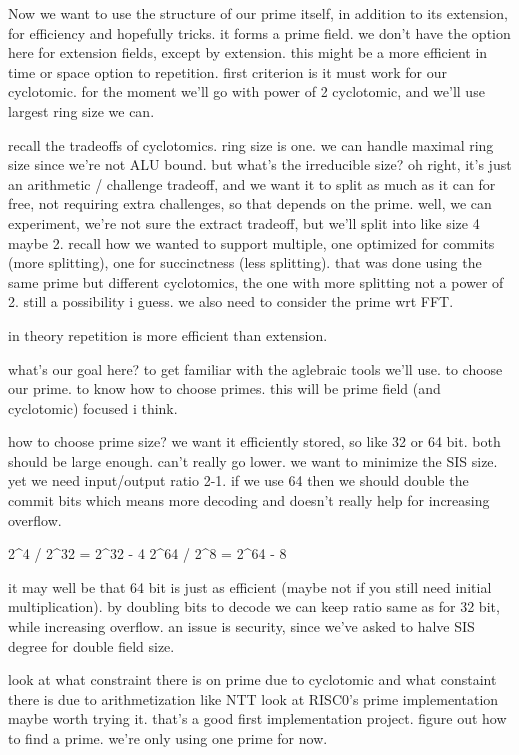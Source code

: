 Now we want to use the structure of our prime itself, in addition to its extension, for efficiency and hopefully tricks. it forms a prime field. we don't have the option here for extension fields, except by extension. this might be a more efficient in time or space option to repetition. 
first criterion is it must work for our cyclotomic. for the moment we'll go with power of 2 cyclotomic, and we'll use largest ring size we can.

recall the tradeoffs of cyclotomics.
ring size is one. we can handle maximal ring size since we're not ALU bound.
but what's the irreducible size? oh right, it's just an arithmetic / challenge tradeoff, and we want it to split as much as it can for free, not requiring extra challenges, so that depends on the prime. well, we can experiment, we're not sure the extract tradeoff, but we'll split into like size 4 maybe 2. recall how we wanted to support multiple, one optimized for commits (more splitting), one for succinctness (less splitting). that was done using the same prime but different cyclotomics, the one with more splitting not a power of 2. still a possibility i guess. 
we also need to consider the prime wrt FFT.

in theory repetition is more efficient than extension.


what's our goal here? to get familiar with the aglebraic tools we'll use. to choose our prime. to know how to choose primes.
this will be prime field (and cyclotomic) focused i think. 

how to choose prime size?
we want it efficiently stored, so like 32 or 64 bit. both should be large enough. can't really go lower. we want to minimize the SIS size. yet we need input/output ratio 2-1. if we use 64 then we should double the commit bits which means more decoding and doesn't really help for increasing overflow. 

2^4 / 2^32 = 2^{32 - 4}
2^64 / 2^8 = 2^{64 - 8}

it may well be that 64 bit is just as efficient (maybe not if you still need initial multiplication).
by doubling bits to decode we can keep ratio same as for 32 bit, while increasing overflow.
an issue is security, since we've asked to halve SIS degree for double field size.


look at what constraint there is on prime due to cyclotomic
and what constaint there is due to arithmetization like NTT
look at RISC0's prime implementation
    maybe worth trying it. that's a good first implementation project.
figure out how to find a prime. we're only using one prime for now.


